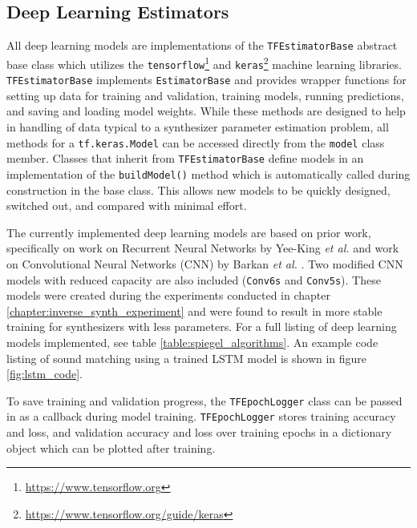 \subsection{Deep Learning Estimators}
All deep learning models are implementations of the \texttt{TFEstimatorBase} abstract base class which utilizes the \texttt{tensorflow}\footnote{\url{https://www.tensorflow.org}} and \texttt{keras}\footnote{\url{https://www.tensorflow.org/guide/keras}} machine learning libraries. \texttt{TFEstimatorBase} implements \texttt{EstimatorBase} and provides wrapper functions for setting up data for training and validation, training models, running predictions, and saving and loading model weights. While these methods are designed to help in handling of data typical to a synthesizer parameter estimation problem, all methods for a \texttt{tf.keras.Model} can be accessed directly from the \texttt{model} class member. Classes that inherit from \texttt{TFEstimatorBase} define models in an implementation of the \texttt{buildModel()} method which is automatically called during construction in the base class. This allows new models to be quickly designed, switched out, and compared with minimal effort.

The currently implemented deep learning models are based on prior work, specifically on work on Recurrent Neural Networks by Yee-King \textit{et al.} \cite{yee2018automatic} and work on Convolutional Neural Networks (CNN) by Barkan \textit{et al.} \cite{barkan2019inversynth}. Two modified CNN models with reduced capacity are also included (\texttt{Conv6s} and \texttt{Conv5s}). These models were created during the experiments conducted in chapter \ref{chapter:inverse_synth_experiment} and were found to result in more stable training for synthesizers with less parameters. For a full listing of deep learning models implemented, see table \ref{table:spiegel_algorithms}. An example code listing of sound matching using a trained LSTM model is shown in figure \ref{fig:lstm_code}.

To save training and validation progress, the \texttt{TFEpochLogger} class can be passed in as a callback during model training. \texttt{TFEpochLogger} stores training accuracy and loss, and validation accuracy and loss over training epochs in a dictionary object which can be plotted after training.


